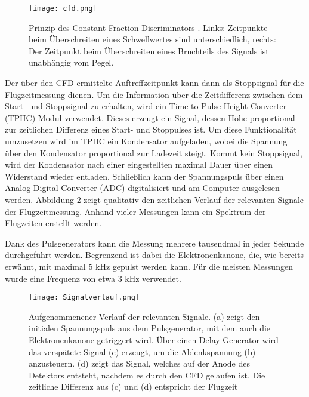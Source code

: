 \begin{figure}
    \centering
    \texttt{[image: cfd.png]}
    \caption[Prinzip des Constant Fraction Discriminators]{Prinzip des Constant Fraction Discriminators \cite{CFD}. Links: Zeitpunkte beim Überschreiten eines Schwellwertes sind unterschiedlich, rechts: Der Zeitpunkt beim Überschreiten eines Bruchteils des Signals ist unabhängig vom Pegel.\\}
    \label{fig:CFD} 
\end{figure}

Der über den CFD ermittelte Auftreffzeitpunkt kann dann als Stoppsignal für die Flugzeitmessung dienen. Um die Information über die Zeitdifferenz zwischen dem Start- und Stoppsignal zu erhalten, wird ein Time-to-Pulse-Height-Converter (TPHC) Modul verwendet. Dieses erzeugt ein Signal, dessen Höhe proportional zur zeitlichen Differenz eines Start- und Stoppulses ist. Um diese Funktionalität umzusetzen wird im TPHC ein Kondensator aufgeladen, wobei die Spannung über den Kondensator proportional zur Ladezeit steigt. Kommt kein Stoppsignal, wird der Kondensator nach einer eingestellten maximal Dauer über einen Widerstand wieder entladen. Schließlich kann der Spannungspuls über einen Analog-Digital-Converter (ADC) digitalisiert und am Computer ausgelesen werden. Abbildung \ref{fig:Signal} zeigt qualitativ den zeitlichen Verlauf der relevanten Signale der Flugzeitmessung. Anhand vieler Messungen kann ein Spektrum der Flugzeiten erstellt werden.

Dank des Pulsgenerators kann die Messung mehrere tausendmal in jeder Sekunde durchgeführt werden. Begrenzend ist dabei die Elektronenkanone, die, wie bereits erwähnt, mit maximal 5 kHz gepulst werden kann. Für die meisten Messungen wurde eine Frequenz von etwa 3 kHz verwendet.

\begin{figure}
    \centering
    \texttt{[image: Signalverlauf.png]}
    \caption[Aufgenommenener Verlauf der relevanten Signale der ToF-Messung]{Aufgenommenener Verlauf der relevanten Signale. (a) zeigt den initialen Spannungspuls aus dem Pulsgenerator, mit dem auch die Elektronenkanone getriggert wird. Über einen Delay-Generator wird das verspätete Signal (c) erzeugt, um die Ablenkspannung (b) anzusteuern. (d) zeigt das Signal, welches auf der Anode des Detektors entsteht, nachdem es durch den CFD gelaufen ist. Die zeitliche Differenz aus (c) und (d) entspricht der Flugzeit}
    \label{fig:Signal} 
\end{figure}

